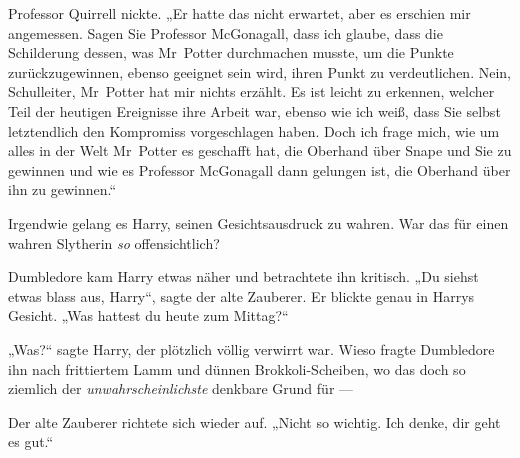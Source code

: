 Professor Quirrell nickte.
„Er hatte das nicht erwartet, aber es erschien mir angemessen. Sagen Sie Professor McGonagall, dass ich glaube, dass die Schilderung dessen, was Mr~Potter durchmachen musste, um die Punkte zurückzugewinnen, ebenso geeignet sein wird, ihren Punkt zu verdeutlichen. Nein, Schulleiter, Mr~Potter hat mir nichts erzählt. Es ist leicht zu erkennen, welcher Teil der heutigen Ereignisse ihre Arbeit war, ebenso wie ich weiß, dass Sie selbst letztendlich den Kompromiss vorgeschlagen haben. Doch ich frage mich, wie um alles in der Welt Mr~Potter es geschafft hat, die Oberhand über Snape und Sie zu gewinnen und wie es Professor McGonagall dann gelungen ist, die Oberhand über ihn zu gewinnen.“

Irgendwie gelang es Harry, seinen Gesichtsausdruck zu wahren. War das für einen wahren Slytherin \emph{so} offensichtlich?

Dumbledore kam Harry etwas näher und betrachtete ihn kritisch.
„Du siehst etwas blass aus, Harry“, sagte der alte Zauberer. Er blickte genau in Harrys Gesicht.
„Was hattest du heute zum Mittag?“

„Was?“ sagte Harry, der plötzlich völlig verwirrt war. Wieso fragte Dumbledore ihn nach frittiertem Lamm und dünnen Brokkoli-Scheiben, wo das doch so ziemlich der \emph{unwahrscheinlichste} denkbare Grund für —

Der alte Zauberer richtete sich wieder auf.
„Nicht so wichtig. Ich denke, dir geht es gut.“

